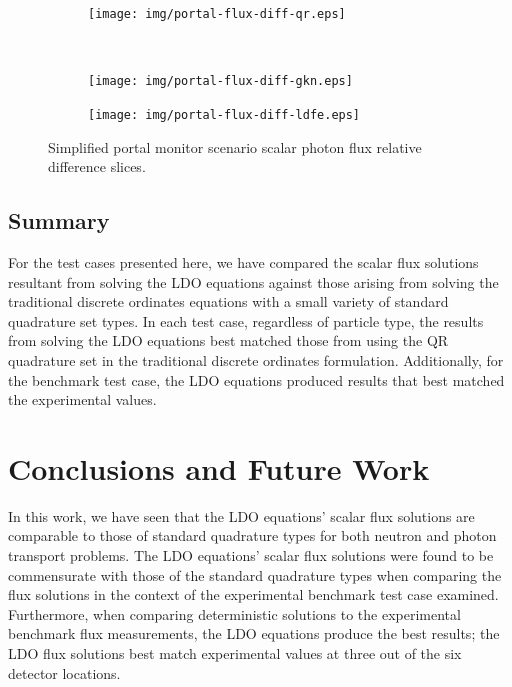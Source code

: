 \documentclass{article} %
\begin{document}
\clearpage
\begin{figure}[!htb]
\begin{subfigure}{\textwidth}
\centering
\texttt{[image: img/portal-flux-diff-qr.eps]}
\end{subfigure}
\\
\begin{subfigure}{\textwidth}
\centering
\texttt{[image: img/portal-flux-diff-gkn.eps]}
\end{subfigure}
\end{figure}
\clearpage
\begin{figure}[!htb]
\ContinuedFloat
\begin{subfigure}{\textwidth}
\centering
\texttt{[image: img/portal-flux-diff-ldfe.eps]}
\end{subfigure}
\caption{Simplified portal monitor scenario scalar photon flux relative
         difference slices.}
\label{cargo-fwd-diff-rel}
\end{figure}

\FloatBarrier
\subsection{Summary}

For the test cases presented here, we have compared the scalar flux solutions
resultant from solving the LDO equations against those arising from solving
the traditional discrete ordinates equations with a small variety of standard
quadrature set types. In each test case, regardless of particle type, the
results from solving the LDO equations best matched those from using the QR
quadrature set in the traditional discrete ordinates formulation.
Additionally, for the benchmark test case, the LDO equations produced results
that best matched the experimental values.

\section{Conclusions and Future Work}
\label{sec:conclusions}

In this work, we have seen that the LDO equations' scalar flux solutions are
comparable to those of standard quadrature types for both neutron and photon
transport problems. The LDO equations' scalar flux solutions were found to be
commensurate with those of the standard quadrature types when comparing the
flux solutions in the context of the experimental benchmark test case
examined. Furthermore, when comparing deterministic solutions to the
experimental benchmark flux measurements, the LDO equations produce the best
results; the LDO flux solutions best match experimental values at three out of
the six detector locations.
\end{document}
